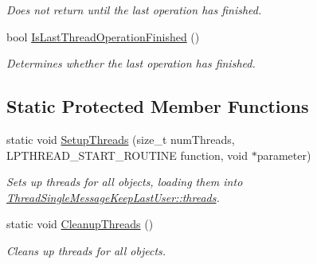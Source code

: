\begin{DoxyCompactItemize}
\begin{DoxyCompactList}\small\item\em Does not return until the last operation has finished. \item\end{DoxyCompactList}\item 
bool \hyperlink{class_thread_single_message_keep_last_user_ab4d9a5aa8c1c5e97972b78b43b7efc9e}{IsLastThreadOperationFinished} ()
\begin{DoxyCompactList}\small\item\em Determines whether the last operation has finished. \item\end{DoxyCompactList}\end{DoxyCompactItemize}
\subsection*{Static Protected Member Functions}
\begin{DoxyCompactItemize}
\item 
static void \hyperlink{class_thread_single_message_keep_last_user_ae80d14a5236cc0465e26558808969849}{SetupThreads} (size\_\-t numThreads, LPTHREAD\_\-START\_\-ROUTINE function, void $\ast$parameter)
\begin{DoxyCompactList}\small\item\em Sets up threads for all objects, loading them into \hyperlink{class_thread_single_message_keep_last_user_a63c547a8951cede4c6a9bbd69688980d}{ThreadSingleMessageKeepLastUser::threads}. \item\end{DoxyCompactList}\item 
static void \hyperlink{class_thread_single_message_keep_last_user_a7cf594df8a6a9da94bdbeb709e906238}{CleanupThreads} ()
\begin{DoxyCompactList}\small\item\em Cleans up threads for all objects. \item\end{DoxyCompactList}\end{DoxyCompactItemize}

